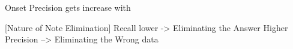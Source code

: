\documentclass{article}
\begin{document}
Onset Precision gets increase with 

[Nature of Note Elimination]
Recall lower -> Eliminating the Answer
Higher Precision --> Eliminating the Wrong data











\end{document}
